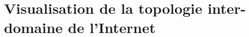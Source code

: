 \documentclass[a4paper,12pt]{article}
\title{}
\author{}
\begin{document}
\maketitle

\begin{abstract}

\end{abstract}


\newpage
\section{Visualisation de la topologie inter-domaine de l'Internet}








\end{document}
